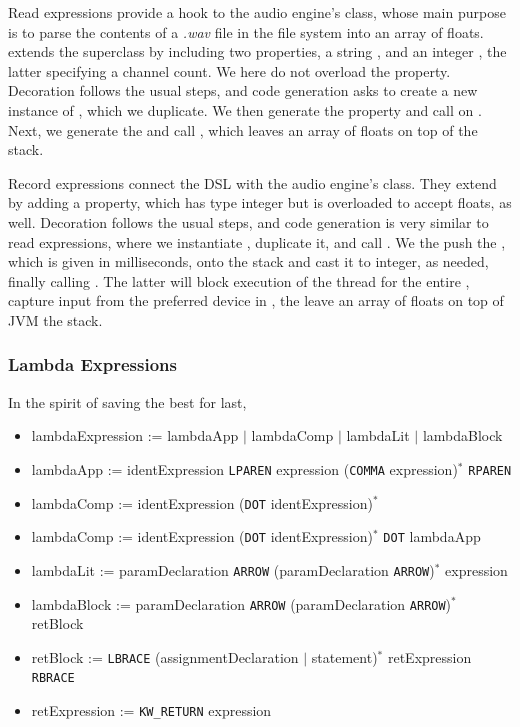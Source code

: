 Read expressions provide a hook to the audio engine's  class, whose main purpose is to parse the contents of a \emph{.wav} file in the file system into an array of floats.  extends the superclass by including two properties, a string , and an integer , the latter specifying a channel count. We here do not overload the  property. Decoration follows the usual steps, and code generation asks  to create a new instance of , which we duplicate. We then generate the  property and call  on . Next, we generate the  and call , which leaves an array of floats on top of the stack.

Record expressions connect the DSL with the audio engine's  class. They extend  by adding a  property, which has type integer but is overloaded to accept floats, as well. Decoration follows the usual steps, and code generation is very similar to read expressions, where we instantiate , duplicate it, and call . We the push the , which is given in milliseconds, onto the stack and cast it to integer, as needed, finally calling . The latter will block execution of the  thread for the entire , capture input from the preferred device in , the leave an array of floats on top of JVM the stack.

\subsubsection{Lambda Expressions}

In the spirit of saving the best for last,

\begin{itemize}
	\item lambdaExpression := lambdaApp $|$ lambdaComp $|$ lambdaLit $|$ lambdaBlock
	\item lambdaApp := identExpression \texttt{LPAREN} expression (\texttt{COMMA} expression)$^*$ \texttt{RPAREN}
	\item lambdaComp := identExpression (\texttt{DOT} identExpression)$^*$
	\item lambdaComp := identExpression (\texttt{DOT} identExpression)$^*$ \texttt{DOT} lambdaApp
	\item lambdaLit := paramDeclaration \texttt{ARROW} (paramDeclaration \texttt{ARROW})$^*$ expression
	\item lambdaBlock := paramDeclaration \texttt{ARROW} (paramDeclaration \texttt{ARROW})$^*$ retBlock
	\item retBlock := \texttt{LBRACE} (assignmentDeclaration $|$ statement)$^*$ retExpression \texttt{RBRACE}
	\item retExpression := \texttt{KW\_RETURN} expression
\end{itemize}